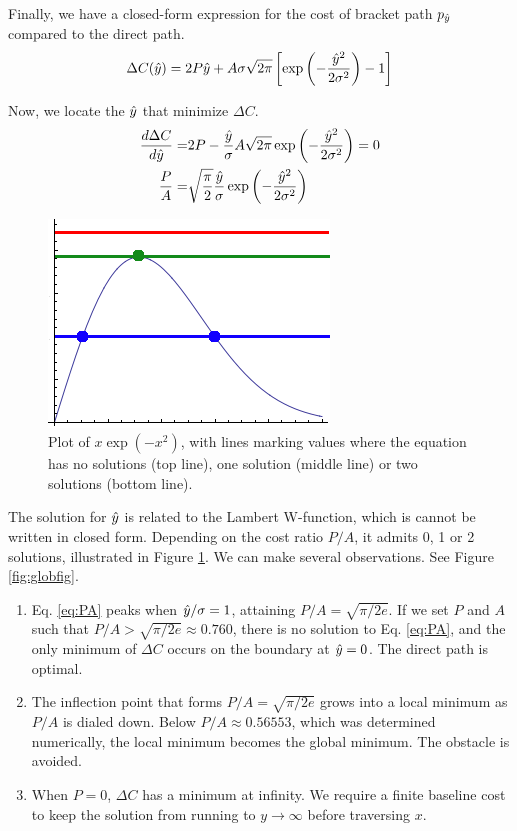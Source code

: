 Finally, we have a closed-form expression for the cost of bracket path $p_{\hat{y}}$ compared to the direct path.
\begin{equation}
\Delta C(\hat{y}) = 2P\hat{y} + A\sigma\sqrt{2\pi}\left[\exp\left(-\frac{\hat{y}^2}{2\sigma^2}\right) - 1\right]
\end{equation}

Now, we locate the $\hat{y}$ that minimize $\Delta C$.
\begin{align}
\frac{d\Delta C}{d\yhat} = 
&2P - \frac{\yhat}{\sigma}A\sqrt{2\pi} \exp\left(-\frac{\yhat^2}{2\sigma^2} \right) = 0 \\
  \frac{P}{A} =& \sqrt{\frac{\pi}{2}} \frac{\yhat}{\sigma} \exp\left(-\frac{\yhat^2}{2\sigma^2} \right)
  \label{eq:PA}
\end{align}
\begin{figure}
\centering
\includegraphics[width=0.4\columnwidth]{graphix/lambert.png}
\caption{Plot of $x \exp(-x^2)$, with lines marking values where the equation has no solutions (top line), one solution (middle line) or two solutions (bottom line).}
\label{fig:lambert}
\end{figure}

The solution for $\hat{y}$ is related to the Lambert W-function, which is cannot be written in closed form.  Depending on the cost ratio $P/A$, it admits 0, 1 or 2 solutions, illustrated in Figure \ref{fig:lambert}. We can make several observations. See Figure \ref{fig:globfig}.
\begin{enumerate}
\item Eq. \ref{eq:PA} peaks when $\hat{y}/\sigma = 1$, attaining $P/A=\sqrt{\pi/2e}$. If we set $P$ and $A$ such that $P/A > \sqrt{\pi/2e} \approx 0.760$, there is no solution to Eq. \ref{eq:PA}, and the only minimum of $\Delta C$ occurs on the boundary at $\hat{y}=0$. The direct path is optimal.
\item The inflection point that forms $P/A = \sqrt{\pi/2e}$ grows into a local minimum as $P/A$ is dialed down. Below $P/A \approx 0.56553$, which was determined numerically, the local minimum becomes the global minimum. The obstacle is avoided.
\item When $P=0$, $\Delta C$ has a minimum at infinity. We require a finite baseline cost to keep the solution from running to $y \rightarrow \infty$ before traversing $x$.
\end{enumerate}

